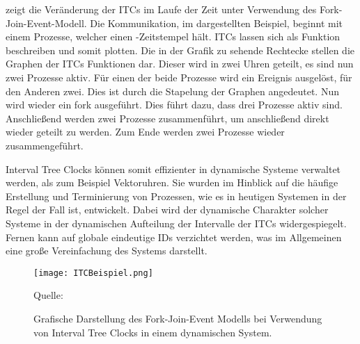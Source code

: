  zeigt die Veränderung der ITCs im Laufe der Zeit unter Verwendung des Fork-Join-Event-Modell.
Die Kommunikation, im dargestellten Beispiel, beginnt mit einem Prozesse, welcher einen -Zeitstempel hält.
ITCs lassen sich als Funktion beschreiben und somit plotten.
Die in der Grafik zu sehende Rechtecke stellen die Graphen der ITCs Funktionen dar.
Dieser wird in zwei Uhren geteilt, es sind nun zwei Prozesse aktiv.
Für einen der beide Prozesse wird ein Ereignis ausgelöst, für den Anderen zwei.
Dies ist durch die Stapelung der Graphen angedeutet.
Nun wird wieder ein fork ausgeführt. Dies führt dazu, dass drei Prozesse aktiv sind.
Anschließend werden zwei Prozesse zusammenführt, um anschließend direkt wieder geteilt zu werden.
Zum Ende werden zwei Prozesse wieder zusammengeführt.

Interval Tree Clocks können somit effizienter in dynamische Systeme verwaltet werden, als zum Beispiel Vektoruhren.
Sie wurden im Hinblick auf die häufige Erstellung und Terminierung von Prozessen, wie es in heutigen Systemen in der Regel der Fall ist, entwickelt.
Dabei wird der dynamische Charakter solcher Systeme in der dynamischen Aufteilung der Intervalle der ITCs widergespiegelt.
Fernen kann auf globale eindeutige IDs verzichtet werden, was im Allgemeinen eine große Vereinfachung des Systems darstellt.

\begin{figure}[ht]
    \centering
    \texttt{[image: ITCBeispiel.png]}
    \caption[Fork-Join-Event-Modell von Interval Tree Clocks]{Grafische Darstellung des Fork-Join-Event Modells bei Verwendung von Interval Tree Clocks in einem dynamischen System.}
    Quelle: \cite{almeida2008treeclocks}
    \label{fig:itcBsp}
\end{figure} 





